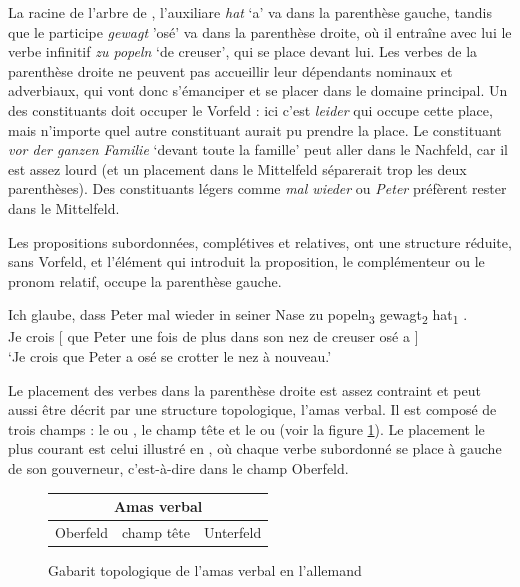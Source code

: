 {    La racine de l'arbre de , l'auxiliare \textit{hat} `a' va dans la parenthèse gauche, tandis que le participe \textit{gewagt} 'osé' va dans la parenthèse droite, où il entraîne avec lui le verbe infinitif \textit{zu popeln} `de creuser', qui se place devant lui. Les verbes de la parenthèse droite ne peuvent pas accueillir leur dépendants nominaux et adverbiaux, qui vont donc s'émanciper et se placer dans le domaine principal. Un des constituants doit occuper le Vorfeld : ici c'est \textit{leider} qui occupe cette place, mais n'importe quel autre constituant aurait pu prendre la place.
    Le constituant \textit{vor der ganzen Familie} ‘devant toute la famille’ peut aller dans le Nachfeld, car il est assez lourd (et un placement dans le Mittelfeld séparerait trop les deux parenthèses). Des constituants légers comme \textit{mal wieder} ou \textit{Peter} préfèrent rester dans le Mittelfeld.

    Les propositions subordonnées, complétives et relatives, ont une structure réduite, sans Vorfeld, et l’élément qui introduit la proposition, le complémenteur ou le pronom relatif, occupe la parenthèse gauche. 

    \ea\label{ex:glaube}
    \gll  Ich glaube,   {\ob} dass Peter {mal wieder} in seiner Nase zu {popeln\textsubscript{3}} {gewagt\textsubscript{2}} {hat\textsubscript{1}}   {\cb}.\\
    Je crois   [ que  Peter {une fois de plus} dans son nez   de creuser  osé        a   ]\\
    \glt ‘Je crois que Peter a osé se crotter le nez à nouveau.’
    \z
    
    Le placement des verbes dans la parenthèse droite est assez contraint et peut aussi être décrit par une structure topologique, l’amas verbal. Il est composé de trois champs : le  ou , le champ tête et le  ou  (voir la figure \ref{fig:topo-amas-allemand}). Le placement le plus courant est celui illustré en , où chaque verbe subordonné se place à gauche de son gouverneur, c'est-à-dire dans le champ Oberfeld.

    \begin{figure}[H]
    \def\arraystretch{1.5}
    \setlength{\tabcolsep}{4ex}
    \begin{tabular}{|c|c|c|}
    \hline
    \multicolumn{3}{|c|}{\cellcolor{lsDOIGray}Amas verbal}\\
    \hline
    Oberfeld & \cellcolor{lsDOIGray}champ tête & Unterfeld\\
    \hline
    \end{tabular}
    \caption{Gabarit topologique de l'amas verbal en l'allemand\label{fig:topo-amas-allemand}}
    \end{figure}
    
}
